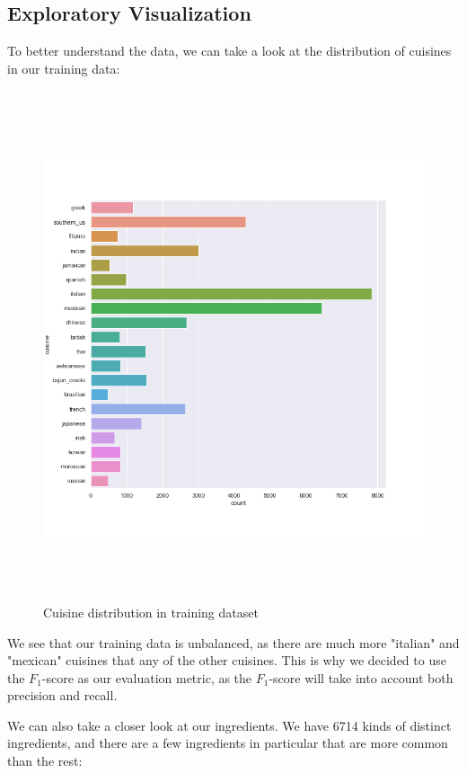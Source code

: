 \documentclass[12pt]{article}
\begin{document}
\subsection{Exploratory Visualization}

To better understand the data, we can take a look at the distribution of cuisines in our training data:

\begin{figure}[!h]
\includegraphics[width=\textwidth, height=15cm]{cuisine-distribution.png}
\caption{Cuisine distribution in training dataset}
\end{figure}

\noindent
We see that our training data is unbalanced, as there are much more "italian" and "mexican" cuisines that any of the other cuisines. This is why we decided to use the $F_1$-score as our evaluation metric, as the $F_1$-score will take into account both precision and recall.

We can also take a closer look at our ingredients. We have 6714 kinds of distinct ingredients, and there are a few ingredients in particular that are more common than the rest:
\end{document}

